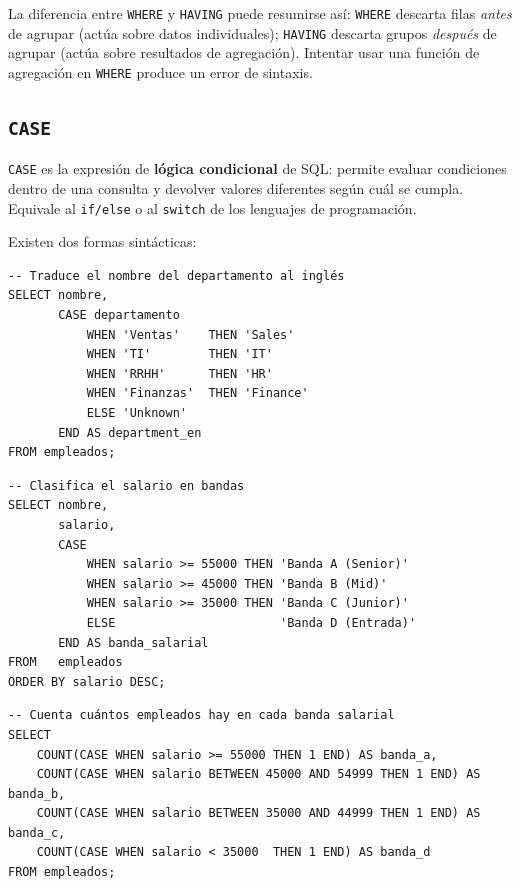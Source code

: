 \begin{ejemplo}
La diferencia entre \texttt{WHERE} y \texttt{HAVING} puede
resumirse así:
\texttt{WHERE} descarta filas \textit{antes} de agrupar
(actúa sobre datos individuales);
\texttt{HAVING} descarta grupos \textit{después} de agrupar
(actúa sobre resultados de agregación).
Intentar usar una función de agregación en \texttt{WHERE} produce
un error de sintaxis.
\end{ejemplo}

\subsection{\texttt{CASE}}

\texttt{CASE} es la expresión de \textbf{lógica condicional} de SQL:
permite evaluar condiciones dentro de una consulta y devolver
valores diferentes según cuál se cumpla.
Equivale al \texttt{if/else} o al \texttt{switch} de los lenguajes
de programación.

Existen dos formas sintácticas:

\begin{lstlisting}[caption={CASE simple (compara un valor contra una lista).}]
-- Traduce el nombre del departamento al inglés
SELECT nombre,
       CASE departamento
           WHEN 'Ventas'    THEN 'Sales'
           WHEN 'TI'        THEN 'IT'
           WHEN 'RRHH'      THEN 'HR'
           WHEN 'Finanzas'  THEN 'Finance'
           ELSE 'Unknown'
       END AS department_en
FROM empleados;
\end{lstlisting}

\begin{lstlisting}[caption={CASE buscado (evalúa condiciones booleanas).}]
-- Clasifica el salario en bandas
SELECT nombre,
       salario,
       CASE
           WHEN salario >= 55000 THEN 'Banda A (Senior)'
           WHEN salario >= 45000 THEN 'Banda B (Mid)'
           WHEN salario >= 35000 THEN 'Banda C (Junior)'
           ELSE                       'Banda D (Entrada)'
       END AS banda_salarial
FROM   empleados
ORDER BY salario DESC;
\end{lstlisting}

\begin{lstlisting}[caption={CASE dentro de funciones de agregación.}]
-- Cuenta cuántos empleados hay en cada banda salarial
SELECT
    COUNT(CASE WHEN salario >= 55000 THEN 1 END) AS banda_a,
    COUNT(CASE WHEN salario BETWEEN 45000 AND 54999 THEN 1 END) AS banda_b,
    COUNT(CASE WHEN salario BETWEEN 35000 AND 44999 THEN 1 END) AS banda_c,
    COUNT(CASE WHEN salario < 35000  THEN 1 END) AS banda_d
FROM empleados;
\end{lstlisting}

